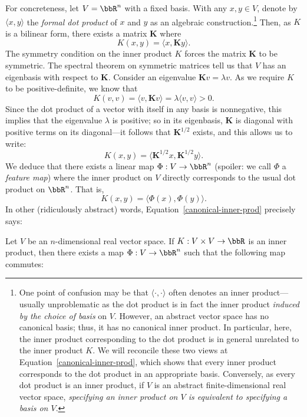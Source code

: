 \documentclass[twoside,11pt]{homework}
\begin{document}
\begin{multicols}{2}
For concreteness, let $V = \bbR^n$ with a fixed basis. With any $x,y \in V$, denote by $\langle x,y\rangle$ the \emph{formal dot product} of $x$ and $y$ as an algebraic construction.\footnote{One point of confusion may be that $\langle \cdot,\cdot \rangle$ often denotes an inner product---usually unproblematic as the dot product is in fact the inner product \emph{induced by the choice of basis} on $V$. However, an abstract vector space has no canonical basis; thus, it has no canonical inner product. In particular, here, the inner product corresponding to the dot product is in general unrelated to the inner product $K$. We will reconcile these two views at Equation~\ref{canonical-inner-prod}, which shows that every inner product corresponds to the dot product in an appropriate basis. Conversely, as every dot product is an inner product, if $V$ is an abstract finite-dimensional real vector space, \emph{specifying an inner product on $V$ is equivalent to specifying a basis on $V$}.} Then, as $K$ is a bilinear form, there exists a matrix $\mathbf{K}$ where
\begin{equation}\label{kernel-history}
  K(x,y) = \langle x, \mathbf{K}y\rangle.
\end{equation}
The symmetry condition on the inner product $K$ forces the matrix $\mathbf{K}$ to be symmetric. The spectral theorem on symmetric matrices tell us that $V$ has an eigenbasis with respect to $\mathbf{K}$. Consider an eigenvalue $\mathbf{K} v = \lambda v$. As we require $K$ to be positive-definite, we know that
\[K(v,v) = \langle v, \mathbf{K}v\rangle = \lambda \langle v,v\rangle> 0.\]
Since the dot product of a vector with itself in any basis is nonnegative, this implies that the eigenvalue $\lambda$ is positive; so in its eigenbasis, $\mathbf{K}$ is diagonal with positive terms on its diagonal---it follows that $\mathbf{K}^{1/2}$ exists, and this allows us to write:
\[K(x,y) = \langle \mathbf{K}^{1/2} x, \mathbf{K}^{1/2}y\rangle.\]
We deduce that there exists a linear map $\Phi: V \to \bbR^n$ (spoiler: we call $\Phi$ a \emph{feature map}) where the inner product on $V$ directly corresponds to the usual dot product on $\bbR^n$. That is,
\begin{equation}\label{canonical-inner-prod}
  K(x,y) = \langle \Phi(x), \Phi(y)\rangle.
\end{equation}
In other (ridiculously abstract) words, Equation~\ref{canonical-inner-prod} precisely says:
\begin{proposition}\label{finite-IP}
  Let $V$ be an $n$-dimensional real vector space. If $K : V \times V \to \bbR$ is an inner product, then there exists a map $\Phi: V \to \bbR^n$ such that the following map commutes:

\end{proposition}
\end{multicols}
\end{document}
